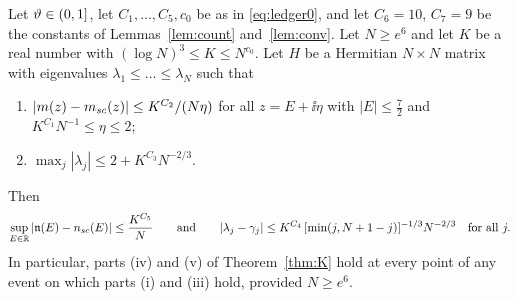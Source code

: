 \begin{proposition}\label{prop:rig}
Let $\vartheta\in(0,1]$, let $C_1,\dots,C_5,c_0$ be as in \eqref{eq:ledger0}, and let $C_6=10$, $C_7=9$ be the constants of Lemmas~\ref{lem:count} and~\ref{lem:conv}. Let $N\ge e^{6}$ and let $K$ be a real number with $(\log N)^3\le K\le N^{c_0}$.
Let $H$ be a Hermitian $N\times N$ matrix with eigenvalues $\lambda_1\le\dots\le\lambda_N$ such that
\begin{enumerate}[label=\textup{(\alph*)},leftmargin=2.2em,itemsep=1pt]
\item $|m(z)-m_{sc}(z)|\le K^{C_2}/(N\eta)$ for all $z=E+\ii\eta$ with $|E|\le\frac72$ and $K^{C_1}N^{-1}\le\eta\le2$;
\item $\max_j|\lambda_j|\le2+K^{C_3}N^{-2/3}$.
\end{enumerate}
Then
\[
 \sup_{E\in\mathbb{R}}|\mathfrak{n}(E)-n_{sc}(E)|\le\frac{K^{C_5}}N\qquad\text{and}\qquad|\lambda_j-\gamma_j|\le K^{C_4}\,[\min(j,N+1-j)]^{-1/3}N^{-2/3}\quad\text{for all }j .
\]
In particular, parts \textup{(iv)} and \textup{(v)} of Theorem~\ref{thm:K} hold at every point of any event on which parts \textup{(i)} and \textup{(iii)} hold, provided $N\ge e^6$.
\end{proposition}
